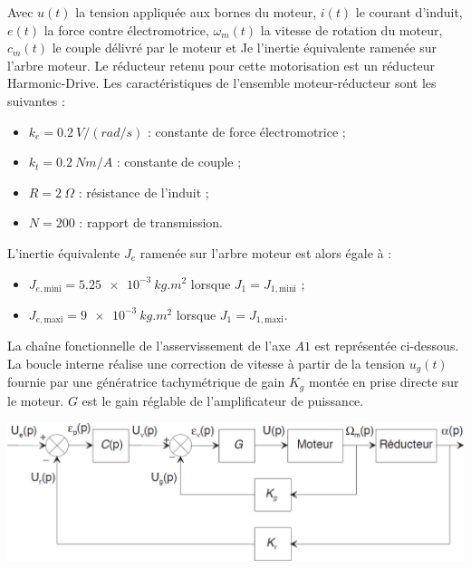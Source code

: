 \documentclass[10pt,fleqn]{article} %
\begin{document}
\begin{multicols}{2}
Avec  $u(t)$  la  tension  appliquée  aux  bornes  du moteur,  $i(t)$  le  courant  d’induit,  $e(t)$  la  force 
contre  électromotrice, $\omega_m(t)$  la  vitesse  de  rotation  du moteur,  $c_m(t)$  le  couple  délivré  par  le 
moteur et Je l’inertie équivalente ramenée sur l’arbre moteur. 
Le  réducteur  retenu  pour  cette  motorisation  est  un  réducteur  Harmonic-Drive.  Les 
caractéristiques de l’ensemble moteur-réducteur sont les suivantes : 
\begin{itemize}
\item $k_e = \SI{0,2}{V/(rad/s)}$ : constante de force électromotrice ; 
\item $k_t = \SI{0,2}{Nm/A}$ : constante de couple ; 
\item $R = \SI{2}{\Omega}$ : résistance de l’induit ; 
\item $N = 200$ : rapport de transmission.
\end{itemize} 

L’inertie équivalente $J_e$ ramenée sur l’arbre moteur est alors égale à : 
\begin{itemize}
\item $J_{e,\text{mini}} = \SI{5,25e-3}{kg.m^2}$ lorsque $J_1=J_{1,\text{mini}}$ ; 
\item $J_{e,\text{maxi}} =\SI{9e-3}{kg.m^2}$ lorsque $J_1=J_{1,\text{maxi}}$.
\end{itemize}

La chaîne fonctionnelle de l’asservissement de l’axe $A1$ est représentée ci-dessous. La boucle interne réalise une correction de vitesse à partir de la tension $u_g(t)$ fournie par une 
génératrice  tachymétrique  de  gain $K_g$ montée  en  prise  directe  sur  le moteur. $G$  est  le  gain 
réglable de l’amplificateur de puissance. 

\begin{center}
\includegraphics[width=\linewidth]{images/fig_02}
\end{center}


\end{multicols}
\end{document}
